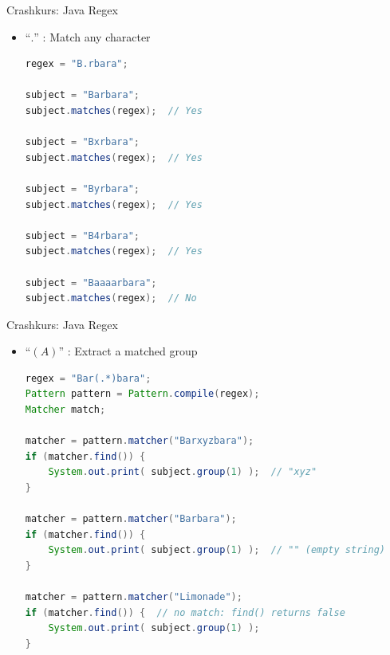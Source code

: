 \documentclass[18pt]{beamer}
\newcommand{\quotes}[1]{``#1''}
\begin{document}
\begin{frame}[fragile]{Crashkurs: Java Regex}
    \begin{itemize}
        \item \Large{\quotes{\alert{\texttt{$.$}}}} : Match any character

        \vspace{.2in}

        \begin{lstlisting}[language=Java,basicstyle=\scriptsize]
regex = "B.rbara";

subject = "Barbara";
subject.matches(regex);  // Yes

subject = "Bxrbara";
subject.matches(regex);  // Yes

subject = "Byrbara";
subject.matches(regex);  // Yes

subject = "B4rbara";
subject.matches(regex);  // Yes

subject = "Baaaarbara";
subject.matches(regex);  // No
        \end{lstlisting}

    \end{itemize}
\end{frame}

\begin{frame}[fragile]{Crashkurs: Java Regex}
    \begin{itemize}
        \item \Large{\quotes{\alert{\texttt{$(A)$}}}} : Extract a matched group

        \vspace{.2in}

        \begin{lstlisting}[language=Java,basicstyle=\scriptsize]
regex = "Bar(.*)bara";
Pattern pattern = Pattern.compile(regex);
Matcher match;

matcher = pattern.matcher("Barxyzbara");
if (matcher.find()) {
    System.out.print( subject.group(1) );  // "xyz"
}

matcher = pattern.matcher("Barbara");
if (matcher.find()) {
    System.out.print( subject.group(1) );  // "" (empty string)
}

matcher = pattern.matcher("Limonade");
if (matcher.find()) {  // no match: find() returns false
    System.out.print( subject.group(1) );
}
        \end{lstlisting}

    \end{itemize}
\end{frame}
\end{document}
